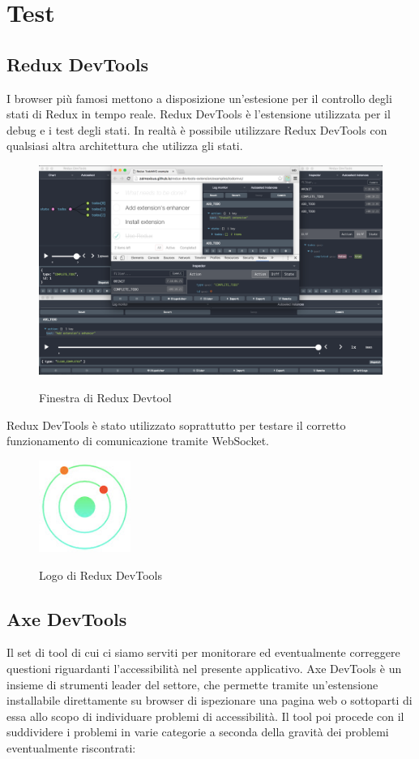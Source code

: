 \chapter{Test}

\section{Redux DevTools}
I browser più famosi mettono a disposizione un'estesione per il controllo degli stati di Redux in tempo reale.
Redux DevTools è l'estensione utilizzata per il debug e i test degli stati.\newline
In realtà è possibile utilizzare Redux DevTools con qualsiasi altra architettura che utilizza gli stati.
\begin{figure}[H]
    \caption{Finestra di Redux Devtool}
    \centering
    \includegraphics[width=150mm]{img/test/redux_screen.png}
    \label{fig:reduxDevWindow}
\end{figure}

\noindent Redux DevTools è stato utilizzato soprattutto per testare il corretto funzionamento di comunicazione tramite WebSocket. 
\begin{figure}[H]
    \caption{Logo di Redux DevTools}
    \centering
    \includegraphics[width=30mm]{img/logos/redux_devtool.jpg}
    \label{fig:reduxDev}
\end{figure}

\section{Axe DevTools}
Il set di tool di cui ci siamo serviti per monitorare ed eventualmente correggere questioni riguardanti l'accessibilità nel presente applicativo. Axe DevTools è un insieme di strumenti leader del settore, che permette tramite un'estensione installabile direttamente su browser di ispezionare una pagina web o sottoparti di essa allo scopo di individuare problemi di accessibilità. Il tool poi procede con il suddividere i problemi in varie categorie a seconda della gravità dei problemi eventualmente riscontrati:


